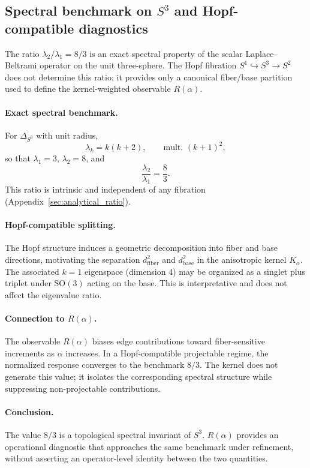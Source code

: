 \subsection*{Spectral benchmark on $S^3$ and Hopf-compatible diagnostics}
  \label{subsec:hopf_spectral}

  The ratio $\lambda_2/\lambda_1=8/3$ is an exact spectral property of
  the scalar Laplace--Beltrami operator on the unit three-sphere.
  The Hopf fibration $S^1\hookrightarrow S^3\to S^2$ does not determine
  this ratio; it provides only a canonical fiber/base partition used
  to define the kernel-weighted observable $R(\alpha)$.

  \paragraph{Exact spectral benchmark.}
    For $\Delta_{S^3}$ with unit radius,
    \[
      \lambda_k = k(k+2), \qquad \text{mult. }(k+1)^2,
    \]
    so that $\lambda_1=3$, $\lambda_2=8$, and
    \[
      \frac{\lambda_2}{\lambda_1}=\frac{8}{3}.
    \]
    This ratio is intrinsic and independent of any fibration
    (Appendix~\ref{sec:analytical_ratio}).

  \paragraph{Hopf-compatible splitting.}
    The Hopf structure induces a geometric decomposition into
    fiber and base directions, motivating the separation
    $d_{\mathrm{fiber}}^2$ and $d_{\mathrm{base}}^2$
    in the anisotropic kernel $K_\alpha$.
    The associated $k=1$ eigenspace (dimension $4$)
    may be organized as a singlet plus triplet under
    $\mathrm{SO}(3)$ acting on the base.
    This is interpretative and does not affect the eigenvalue ratio.

  \paragraph{Connection to $R(\alpha)$.}
    The observable
    $R(\alpha)$ biases edge contributions toward fiber-sensitive
    increments as $\alpha$ increases.
    In a Hopf-compatible projectable regime,
    the normalized response converges to the benchmark $8/3$.
    The kernel does not generate this value; it isolates
    the corresponding spectral structure while suppressing
    non-projectable contributions.

  \paragraph{Conclusion.}
    The value $8/3$ is a topological spectral invariant of $S^3$.
    $R(\alpha)$ provides an operational diagnostic that approaches
    the same benchmark under refinement, without asserting an
    operator-level identity between the two quantities.

